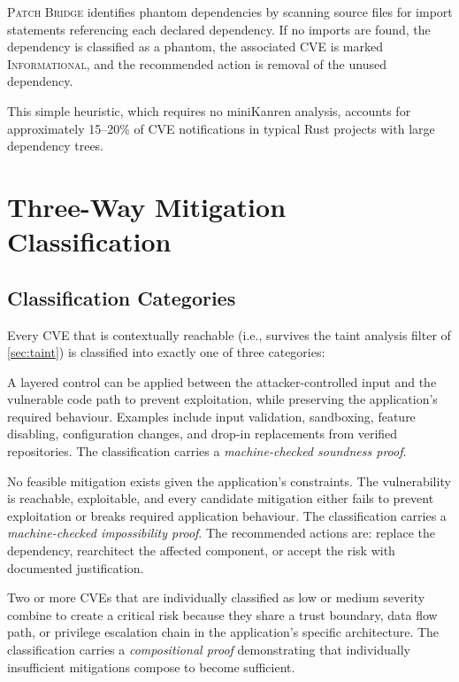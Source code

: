 \documentclass[11pt,twocolumn]{article}
\begin{document}
\textsc{Patch Bridge} identifies phantom dependencies by scanning
source files for import statements referencing each declared
dependency. If no imports are found, the dependency is classified
as a phantom, the associated CVE is marked \textsc{Informational},
and the recommended action is removal of the unused dependency.

This simple heuristic, which requires no miniKanren analysis,
accounts for approximately 15--20\% of CVE notifications in
typical Rust projects with large dependency trees.

\section{Three-Way Mitigation Classification}
\label{sec:classification}

\subsection{Classification Categories}

Every CVE that is contextually reachable (i.e., survives the taint
analysis filter of \cref{sec:taint}) is classified into exactly one
of three categories:

\begin{description}[nosep,leftmargin=1em]
  \item[\textsc{Mitigable}.] A layered control can be applied between
    the attacker-controlled input and the vulnerable code path to
    prevent exploitation, while preserving the application's required
    behaviour. Examples include input validation, sandboxing, feature
    disabling, configuration changes, and drop-in replacements from
    verified repositories. The classification carries a
    \emph{machine-checked soundness proof}.
  \item[\textsc{Unmitigable}.] No feasible mitigation exists given the
    application's constraints. The vulnerability is reachable,
    exploitable, and every candidate mitigation either fails to prevent
    exploitation or breaks required application behaviour. The
    classification carries a \emph{machine-checked impossibility proof}.
    The recommended actions are: replace the dependency, rearchitect
    the affected component, or accept the risk with documented
    justification.
  \item[\textsc{Concatenative}.] Two or more CVEs that are individually
    classified as low or medium severity combine to create a critical
    risk because they share a trust boundary, data flow path, or
    privilege escalation chain in the application's specific
    architecture. The classification carries a \emph{compositional
    proof} demonstrating that individually insufficient mitigations
    compose to become sufficient.
\end{description}
\end{document}
